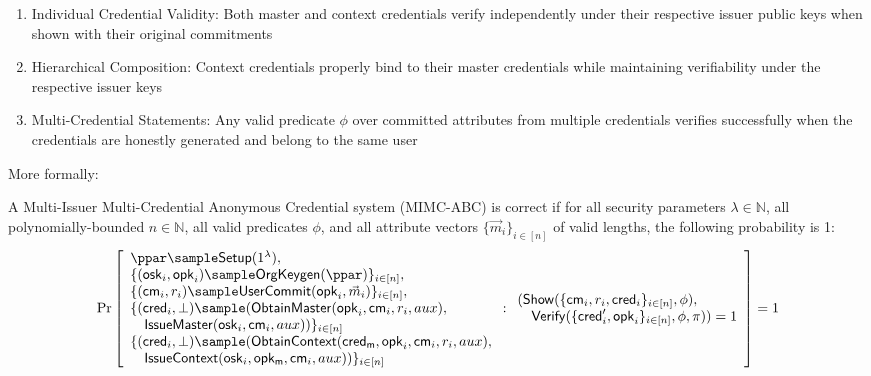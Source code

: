 \begin{enumerate}
    \item Individual Credential Validity: Both master and context credentials verify independently under their respective issuer public keys when shown with their original commitments
    \item Hierarchical Composition: Context credentials properly bind to their master credentials while maintaining verifiability under the respective issuer keys
    \item Multi-Credential Statements: Any valid predicate $\phi$ over committed attributes from multiple credentials verifies successfully when the credentials are honestly generated and belong to the same user
\end{enumerate}

\noindent More formally:

\begin{definition}[Correctness]
A Multi-Issuer Multi-Credential Anonymous Credential system (MIMC-ABC) is correct if for all security parameters $\lambda \in \mathbb{N}$, all polynomially-bounded $n \in \mathbb{N}$, all valid predicates $\phi$, and all attribute vectors $\{\vec{m}_i\}_{i \in [n]}$ of valid lengths, the following probability is 1:
\[
        \Pr
            \left [
            \begin{array}{l}
                \ppar \sample \mathsf{Setup}(1^\lambda),\\
        \{(\mathsf{osk}_i, \mathsf{opk}_i) \sample \mathsf{OrgKeygen}(\ppar)\}_{i \in [n]},\\
        \{(\mathsf{cm}_i, r_i) \sample \mathsf{UserCommit}(\mathsf{opk}_i, \vec{m}_i)\}_{i \in [n]},\\
        \{(\mathsf{cred}_i, \bot) \sample (\mathsf{ObtainMaster}(\mathsf{opk}_i, \mathsf{cm}_i, r_i, aux),\\
        \quad\mathsf{IssueMaster}(\mathsf{osk}_i, \mathsf{cm}_i, aux))\}_{i \in [n]} \\
         \{(\mathsf{cred}_i, \bot) \sample (\mathsf{ObtainContext}(\mathsf{cred_m}, \mathsf{opk}_i, \mathsf{cm}_i, r_i, aux),\\
        \quad\mathsf{IssueContext}(\mathsf{osk}_i, \mathsf{opk_m}, \mathsf{cm}_i, aux))\}_{i \in [n]}
            \end{array}
                : 
                \begin{array}{l}
                   (\mathsf{Show}(\{\mathsf{cm}_i, r_i, \mathsf{cred}_i\}_{i \in [n]}, \phi),\\
                    \quad\mathsf{Verify}(\{\mathsf{cred}'_i, \mathsf{opk}_i\}_{i \in [n]}, \phi, \pi)) = 1
                \end{array}
                \right ]
             = 1
\]
\
\end{definition}









